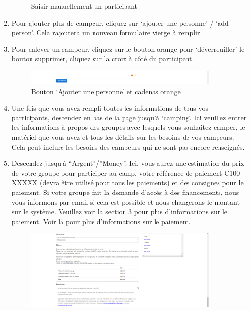 \documentclass[a4paper, 11pt]{report}
\begin{document}
\begin{enumerate}
\begin{figure}[H]
        \caption{Saisir manuellement un participant}
    \end{figure}
    \item Pour ajouter plus de campeur, cliquez sur `ajouter une personne' / `add person'. Cela rajoutera un nouveau formulaire vierge \`a remplir.
    \item  Pour enlever un campeur, cliquez sur le bouton orange pour `d\'everrouiller' le bouton supprimer, cliquez sur la croix \`a côt\'e du participant.
    \begin{figure}[H]
        \centering
        \includegraphics[width=0.9\textwidth]{assets/2-add-person-button.png}
        \caption{Bouton `Ajouter une personne' et cadenas orange}
    \end{figure}
    \item \label{everyone-steps}Une fois que vous avez rempli toutes les informations de tous vos participants, descendez en bas de la page jusqu'\`a `camping'. Ici veuillez entrer les informations \`a propos des groupes avec lesquels vous souhaitez camper, le mat\'eriel que vous avez et tous les d\'etails sur les besoins de vos campeurs. Cela peut inclure les besoins des campeurs qui ne sont pas encore renseign\'es. 
    \item  Descendez jusqu'\`a “Argent”/”Money”. Ici, vous aurez une estimation du prix de votre groupe pour participer au camp, votre r\'ef\'erence de paiement C100-XXXXX (devra \^etre utilis\'e pour tous les paiements) et des consignes pour le paiement. Si votre groupe fait la demande d'acc\`es \`a des financements, nous vous informons par email si cela est possible et nous changerons le montant sur le syst\`eme. Veuillez voir la section 3 pour plus d'informations sur le paiement. Voir la  pour plus d'informations sur le paiement. 
    \begin{figure}[H]
        \centering
        \includegraphics[width=0.9\textwidth]{assets/2-money.png}

\end{figure}
\end{enumerate}
\end{document}
